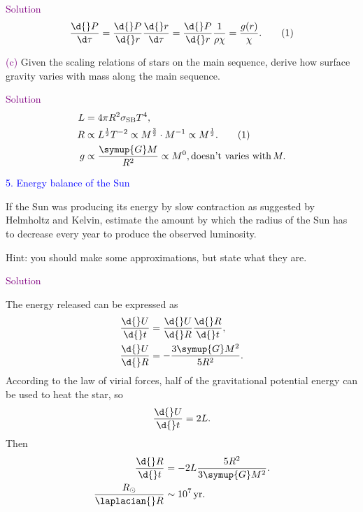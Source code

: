 \documentclass[UTF8, 12pt, a4paper, oneside, twocolumn, fontset=none]{ctexart}
\begin{document}
\hspace*{\fill}

\noindent\textcolor{purple}{Solution}
\begin{align}
\frac{\d{}P}{\d\tau}=\frac{\d{}P}{\d{}r}\frac{\d{}r}{\d\tau}=\frac{\d{}P}{\d{}r}\frac{1}{\rho\chi}=\frac{g\mleft(r\mright)}{\chi}.\tag{1}
\end{align}

\hspace*{\fill}

\noindent\textcolor{purple}{(c)} Given the scaling relations of stars on the main sequence, derive how surface gravity varies with mass along the main sequence.

\hspace*{\fill}

\noindent\textcolor{purple}{Solution}
\begin{align}
L&=4\pi{}R^{2}\sigma_{\mathrm{SB}}T^{4},\notag\\
R&\propto{}L^{\frac{1}{2}}T^{-2}\propto{}M^{\frac{3}{2}}\cdot{}M^{-1}\propto{}M^{\frac{1}{2}}.\tag{1}\\
g&\propto\frac{\symup{G}M}{R^{2}}\propto{}M^{0},\text{doesn't varies with}\, M.\notag
\end{align}

\hspace*{\fill}

\noindent\textcolor{blue}{5. Energy balance of the Sun}

\noindent If the Sun was producing its energy by slow contraction as suggested by Helmholtz and Kelvin, estimate the amount by which the radius of the Sun has to decrease every year to produce the observed luminosity.

\noindent Hint: you should make some approximations, but state what they are.

\hspace*{\fill}

\noindent\textcolor{purple}{Solution}

The energy released can be expressed as
\begin{align}
\frac{\d{}U}{\d{}t}&=\frac{\d{}U}{\d{}R}\frac{\d{}R}{\d{}t},\notag\\
\frac{\d{}U}{\d{}R}&=-\frac{3\symup{G}M^{2}}{5R^{2}}.\notag
\end{align}
According to the law of virial forces, half of the gravitational potential energy can be used to heat the star, so
\begin{equation}
\frac{\d{}U}{\d{}t}=2L.\notag
\end{equation}
Then
\begin{align}
\frac{\d{}R}{\d{}t}&=-2L\frac{5R^{2}}{3\symup{G}M^{2}}.\notag\\
\frac{R_{\odot}}{\laplacian{}R}&\sim\qty{e7}{yr}.\notag
\end{align}
\end{document}
